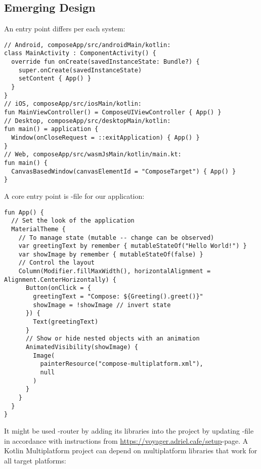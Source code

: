 
\subsection{Emerging Design}

An entry point differs per each system:

\begin{lstlisting}
// Android, composeApp/src/androidMain/kotlin:
class MainActivity : ComponentActivity() {
  override fun onCreate(savedInstanceState: Bundle?) {
    super.onCreate(savedInstanceState)
    setContent { App() }
  }
}
// iOS, composeApp/src/iosMain/kotlin:
fun MainViewController() = ComposeUIViewController { App() }
// Desktop, composeApp/src/desktopMain/kotlin:
fun main() = application {
  Window(onCloseRequest = ::exitApplication) { App() }
}
// Web, composeApp/src/wasmJsMain/kotlin/main.kt:
fun main() {
  CanvasBasedWindow(canvasElementId = "ComposeTarget") { App() }
}
\end{lstlisting}

\noindent A core entry point is -file for our application:

\begin{lstlisting}
fun App() {
  // Set the look of the application
  MaterialTheme {
    // To manage state (mutable -- change can be observed)
    var greetingText by remember { mutableStateOf("Hello World!") }
    var showImage by remember { mutableStateOf(false) }
    // Control the layout
    Column(Modifier.fillMaxWidth(), horizontalAlignment = Alignment.CenterHorizontally) {
      Button(onClick = {
        greetingText = "Compose: ${Greeting().greet()}"
        showImage = !showImage // invert state
      }) {
        Text(greetingText)
      }
      // Show or hide nested objects with an animation
      AnimatedVisibility(showImage) {
        Image(
          painterResource("compose-multiplatform.xml"),
          null
        )
      }
    }
  }
}
\end{lstlisting}

It might be used -router by adding its libraries into the project by updating 
-file in accordance with instructions from 
\href{https://voyager.adriel.cafe/setup}{https://voyager.adriel.cafe/setup}-page.
A Kotlin Multiplatform project can depend on multiplatform libraries that work for all target platforms:

